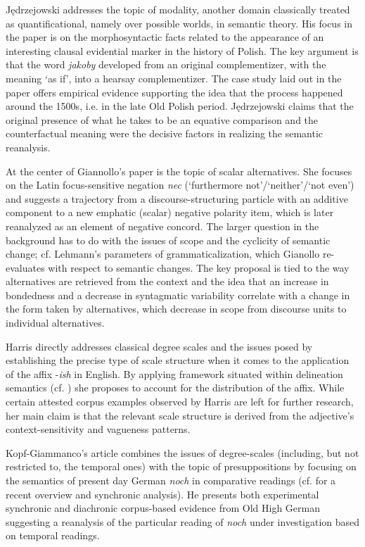 \documentclass[output=paper]{langsci/langscibook}
\begin{document}
Jędrzejowski addresses the topic of modality, another domain classically\linebreak
treated as quantificational, namely over possible worlds, in semantic theory. His focus in the paper is on the morphosyntactic facts related to the appearance of an interesting clausal evidential marker in the history of Polish.  The key argument is that the word \textit{jakoby} developed from an original complementizer, with the meaning ‘as if’, into a hearsay complementizer. The case study laid out in the paper offers empirical evidence supporting the idea that the process happened around the 1500s, i.e. in the late Old Polish period. Jędrzejowski claims that the original presence of what he takes to be an equative comparison and the counterfactual meaning were the decisive factors in realizing the semantic reanalysis.

At the center of Giannollo’s paper is the topic of scalar alternatives. She focuses on the Latin focus-sensitive negation \textit{nec} (`furthermore not'\slash `neither'\slash `not even') and suggests a trajectory from a discourse-structuring particle with an additive component to a new emphatic (scalar) negative polarity item, which is later reanalyzed as an element of negative concord. The larger question in the background has to do with the issues of scope and the cyclicity of semantic change; cf. Lehmann’s parameters of grammaticalization, which Gianollo re-evaluates with respect to semantic changes. The key proposal is tied to the way alternatives are retrieved from the context and the idea that an increase in bondedness and a decrease in syntagmatic variability correlate with a change in the form taken by alternatives, which decrease in scope from discourse units to individual alternatives.

Harris directly addresses classical degree scales and the issues posed by establishing the precise type of scale structure when it comes to the application of the affix -\textit{ish} in English. By applying  framework situated within delineation semantics (cf. \citealt{Cobreros2012}) she proposes to account for the distribution of the affix. While certain attested corpus examples observed by Harris are left for further research, her main claim is that the relevant scale structure is derived from the adjective’s context-sensitivity and vagueness patterns.

Kopf-Giammanco’s article combines the issues of degree-scales (including, but not restricted to, the temporal ones) with the topic of presuppositions by focusing on the semantics of present day German \textit{noch} in comparative readings (cf. \citealt{Beck2019} for a recent overview and synchronic analysis). He presents both experimental synchronic and diachronic corpus-based evidence from Old High German suggesting a reanalysis of the particular reading of \textit{noch} under investigation based on temporal readings.
\end{document}
